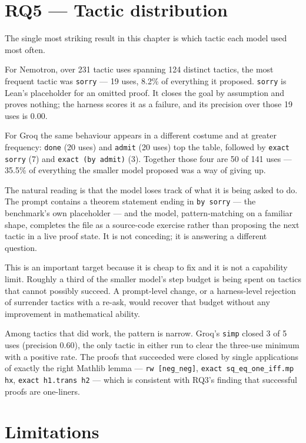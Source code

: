 \section{RQ5 --- Tactic distribution}
\label{sec:results_rq5}

The single most striking result in this chapter is which tactic each model used
most often.

For Nemotron, over 231 tactic uses spanning 124 distinct tactics, the most
frequent tactic was \texttt{sorry} --- 19 uses, 8.2\% of everything it proposed.
\texttt{sorry} is Lean's placeholder for an omitted proof. It closes the goal
by assumption and proves nothing; the harness scores it as a failure, and its
precision over those 19 uses is 0.00.

For Groq the same behaviour appears in a different costume and at greater
frequency: \texttt{done} (20 uses) and \texttt{admit} (20 uses) top the table,
followed by \texttt{exact sorry} (7) and \texttt{exact (by admit)} (3).
Together those four are 50 of 141 uses --- 35.5\% of everything the smaller model
proposed was a way of giving up.

The natural reading is that the model loses track of what it is being asked to do.
The prompt contains a theorem statement ending in \texttt{by sorry} --- the
benchmark's own placeholder --- and the model, pattern-matching on a
familiar shape, completes the file as a source-code exercise rather than
proposing the next tactic in a live proof state. It is not conceding;
it is answering a different question.

This is an important target because it is cheap to fix and it is not a capability
limit. Roughly a third of the smaller model's step budget is being spent on
tactics that cannot possibly succeed. A prompt-level change, or a harness-level
rejection of surrender tactics with a re-ask, would recover that budget without
any improvement in mathematical ability.

Among tactics that did work, the pattern is narrow. Groq's \texttt{simp} closed
3 of 5 uses (precision 0.60), the only tactic in either run to clear the
three-use minimum with a positive rate. The proofs that succeeded were closed by
single applications of exactly the right Mathlib lemma --- \texttt{rw [neg\_neg]},
\texttt{exact sq\_eq\_one\_iff.mp hx}, \texttt{exact h1.trans h2} --- which is
consistent with RQ3's finding that successful proofs are one-liners.

\section{Limitations}
\label{sec:results_limits}

